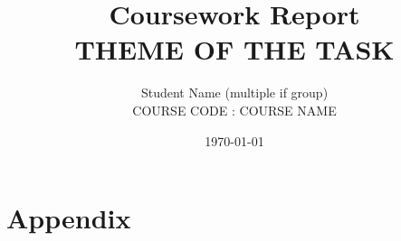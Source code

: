 \documentclass[12pt,letterpaper]{article}
\title{\textbf{Coursework Report \\ THEME OF THE TASK}}
\author{Student Name (multiple if group) \\ COURSE CODE : COURSE NAME}
\date{\today}
\begin{document}



%

\maketitle

\tableofcontents









\newpage

\printbibliography

\section{Appendix}
\appendix

\end{document}
